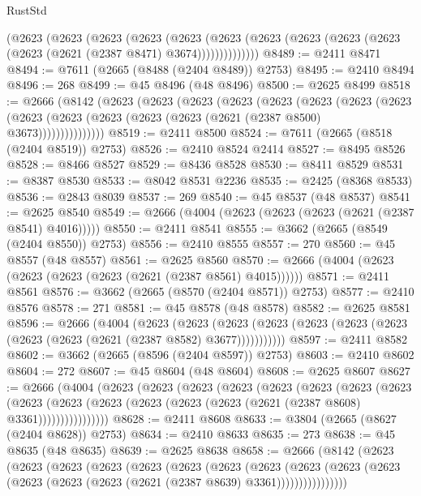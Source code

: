 \begin{lexlean}{RustStd}
\begin{coremodule}
        (@2623
          (@2623
            (@2623
              (@2623
                (@2623
                  (@2623 (@2623 (@2623 (@2623 (@2623 (@2623 (@2621 (@2387 @8471) @3674))))))))))))))
@8489 := @2411 @8471
@8494 := @7611 (@2665 (@8488 (@2404 @8489)) @2753)
@8495 := @2410 @8494
@8496 := 268
@8499 := @45 @8496 (@48 @8496)
@8500 := @2625 @8499
@8518 := @2666
    (@8142
      (@2623
        (@2623
          (@2623
            (@2623
              (@2623
                (@2623
                  (@2623
                    (@2623
                      (@2623 (@2623 (@2623 (@2623 (@2623 (@2621 (@2387 @8500) @3673)))))))))))))))
@8519 := @2411 @8500
@8524 := @7611 (@2665 (@8518 (@2404 @8519)) @2753)
@8526 := @2410 @8524 @2414
@8527 := @8495 @8526
@8528 := @8466 @8527
@8529 := @8436 @8528
@8530 := @8411 @8529
@8531 := @8387 @8530
@8533 := @8042 @8531 @2236
@8535 := @2425 (@8368 @8533)
@8536 := @2843 @8039
@8537 := 269
@8540 := @45 @8537 (@48 @8537)
@8541 := @2625 @8540
@8549 := @2666 (@4004 (@2623 (@2623 (@2623 (@2621 (@2387 @8541) @4016)))))
@8550 := @2411 @8541
@8555 := @3662 (@2665 (@8549 (@2404 @8550)) @2753)
@8556 := @2410 @8555
@8557 := 270
@8560 := @45 @8557 (@48 @8557)
@8561 := @2625 @8560
@8570 := @2666 (@4004 (@2623 (@2623 (@2623 (@2623 (@2621 (@2387 @8561) @4015))))))
@8571 := @2411 @8561
@8576 := @3662 (@2665 (@8570 (@2404 @8571)) @2753)
@8577 := @2410 @8576
@8578 := 271
@8581 := @45 @8578 (@48 @8578)
@8582 := @2625 @8581
@8596 := @2666
    (@4004
      (@2623
        (@2623
          (@2623 (@2623 (@2623 (@2623 (@2623 (@2623 (@2623 (@2621 (@2387 @8582) @3677)))))))))))
@8597 := @2411 @8582
@8602 := @3662 (@2665 (@8596 (@2404 @8597)) @2753)
@8603 := @2410 @8602
@8604 := 272
@8607 := @45 @8604 (@48 @8604)
@8608 := @2625 @8607
@8627 := @2666
    (@4004
      (@2623
        (@2623
          (@2623
            (@2623
              (@2623
                (@2623
                  (@2623
                    (@2623
                      (@2623
                        (@2623
                          (@2623 (@2623 (@2623 (@2623 (@2621 (@2387 @8608) @3361))))))))))))))))
@8628 := @2411 @8608
@8633 := @3804 (@2665 (@8627 (@2404 @8628)) @2753)
@8634 := @2410 @8633
@8635 := 273
@8638 := @45 @8635 (@48 @8635)
@8639 := @2625 @8638
@8658 := @2666
    (@8142
      (@2623
        (@2623
          (@2623
            (@2623
              (@2623
                (@2623
                  (@2623
                    (@2623
                      (@2623
                        (@2623
                          (@2623 (@2623 (@2623 (@2623 (@2621 (@2387 @8639) @3361))))))))))))))))

\end{coremodule}
\end{lexlean}
